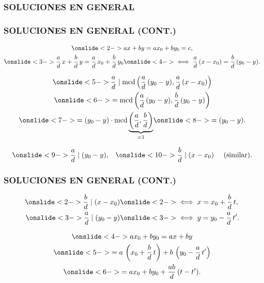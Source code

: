 \begin{frame}
  \frametitle{SOLUCIONES EN GENERAL}

\end{frame}

\begin{frame}
  \frametitle{SOLUCIONES EN GENERAL (CONT.)}
  \begin{gather*}
    \onslide<2->{ax + by = ax_0 + by_0 = c,} \\
    \onslide<3->{\frac{a}{d}\,x + \frac{b}{d}\,y = \frac{a}{d}\,x_0 + \frac{b}{d}\,y_0} \onslide<4->{\iff \frac{a}{d}\,(x - x_0) = \frac{b}{d}\,(y_0 - y).}
  \end{gather*}

  \begin{multline*}
    \onslide<5->{\frac{a}{d} \mid
      \mcd \left(\frac{a}{d}\,(y_0-y), \frac{a}{d}\,(x-x_0)\right)} \\
    \onslide<6->{= \mcd \left(\frac{a}{d}\,(y_0-y), \frac{b}{d}\,(y_0 - y)\right)} \\
    \onslide<7->{= (y_0 - y)\cdot \mcd \underbrace{\left(\frac{a}{d}, \frac{b}{d}\right)}_{= 1}} \onslide<8->{= (y_0 - y).}
  \end{multline*}

  \[
    \onslide<9->{\frac{a}{d} \mid (y_0 - y),} \quad
    \onslide<10->{\frac{b}{d} \mid (x-x_0) \quad \text{ (similar)}.}
  \]
\end{frame}

\begin{frame}
  \frametitle{SOLUCIONES EN GENERAL (CONT.)}

  \begin{align*}
    \onslide<2->{\frac{b}{d} \mid (x-x_0)} & \onslide<2->{\iff x = x_0 + \frac{b}{d}\,t,} \\
    \onslide<3->{\frac{a}{d} \mid (y_0 - y)} & \onslide<3->{\iff y = y_0 - \frac{a}{d}\,t'.}
  \end{align*}

  \begin{multline*}
    \onslide<4->{ax_0 + by_0 = ax + by} \\
    \onslide<5->{= a\,\left(x_0 + \frac{b}{d}\,t\right) + b\,\left(y_0 - \frac{a}{d}\,t'\right)} \\
    \onslide<6->{= ax_0 + by_0 + \frac{ab}{d}\,(t - t').}
  \end{multline*}

\end{frame}

